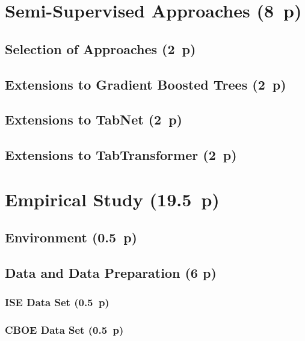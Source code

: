 \newpage
\section{Semi-Supervised Approaches (8~p)}\label{semi-supervised-approaches}

\subsection{Selection of Approaches (2~p)}\label{selection-of-approaches-1}

\subsection{Extensions to Gradient Boosted
  Trees (2~p)}\label{extensions-to-gradient-boosted-trees}

\subsection{Extensions to TabNet (2~p)}\label{extensions-to-tabnet}

\subsection{Extensions to
  TabTransformer (2~p)}\label{extensions-to-tabtransformer}

\newpage
\section{Empirical Study (19.5~p)}\label{empirical-study}

\subsection{Environment (0.5~p)}\label{environment}

\subsection{Data and Data Preparation (6 p)}\label{data-and-data-preparation}

\subsubsection{ISE Data Set (0.5~p)}\label{ise-data-set}

\subsubsection{CBOE Data Set (0.5~p)}\label{cboe-data-set}

